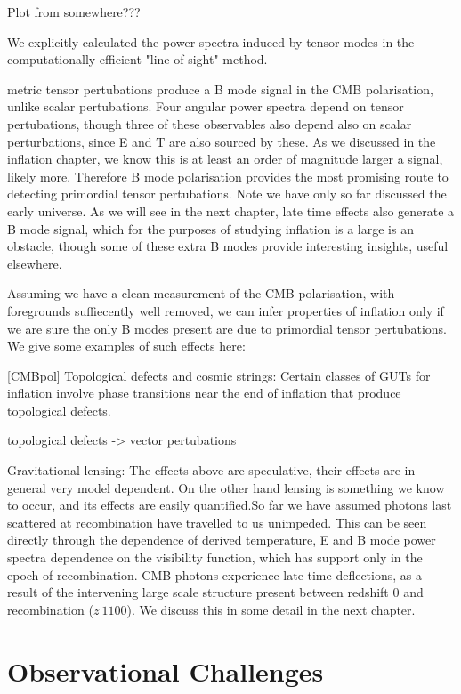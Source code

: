 \documentclass[a4paper,10pt]{article}
\begin{document}
Plot from somewhere???



 We explicitly calculated the power spectra induced by tensor modes in the computationally efficient "line of sight" method. 


metric tensor pertubations produce a B mode signal in the CMB polarisation, unlike scalar pertubations. Four angular power spectra depend on tensor pertubations, though three of these observables also depend also on scalar perturbations, since E and T are also sourced by  these. As we discussed in the inflation chapter, we know this is at least an order of magnitude larger a signal, likely more. Therefore B mode polarisation provides the most promising route to detecting primordial tensor pertubations. Note we have only so far discussed the early universe. As we will see in the next chapter, late time effects also generate a B mode signal, which for the purposes of studying inflation is a large is an obstacle, though some of these extra B modes provide interesting insights, useful elsewhere.

Assuming we have a clean measurement of the CMB polarisation, with foregrounds suffiecently well removed, we can infer properties of inflation only if we are sure the only B modes present are due to primordial tensor pertubations. We give some examples of such effects here:

[CMBpol] Topological defects and cosmic strings: Certain classes of GUTs for inflation involve phase transitions near the end of inflation that produce topological defects. 

topological defects -> vector pertubations



Gravitational lensing: The effects above are speculative, their effects are in general very model dependent. On the other hand lensing is something we know to occur, and its effects are easily quantified.So far we have assumed photons last scattered at recombination have travelled to us unimpeded. This can be seen directly through the dependence of derived temperature, E and B mode  power spectra dependence on the visibility function, which has support only in the epoch of recombination. CMB photons experience late time deflections, as a result of the intervening large scale structure present between redshift 0 and recombination ($z ~ 1100$). We discuss this in some detail in the next chapter.




\section{Observational Challenges}
\end{document}
